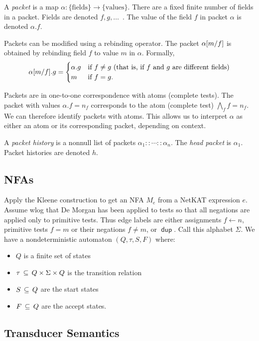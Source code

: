 \documentclass{article}
\newcommand\pdup{\mathop{\mathsf{dup}}}
\begin{document}
A \emph{packet} is a map $\alpha:\{\text{fields}\}\to\{\text{values}\}$. There are a fixed finite number of fields in a packet. Fields are denoted $f,g,\ldots$~. The value of the field $f$ in packet $\alpha$ is denoted $\alpha.f$.

Packets can be modified using a rebinding operator. The packet $\alpha[m/f]$ is obtained by rebinding field $f$ to value $m$ in $\alpha$. Formally,
\begin{align*}
\alpha[m/f].g = \begin{cases}
\alpha.g & \text{if $f\neq g$ (that is, if $f$ and $g$ are different fields)}\\
m & \text{if $f=g$}.
\end{cases}
\end{align*}

Packets are in one-to-one correspondence with atoms (complete tests). The packet with values $\alpha.f=n_f$ corresponds to the atom (complete test) $\bigwedge_f f=n_f$. We can therefore identify packets with atoms. This allows us to interpret $\alpha$ as either an atom or its corresponding packet, depending on context.

A \emph{packet history} is a nonnull list of packets $\alpha_1::\cdots::\alpha_n$. The \emph{head packet} is $\alpha_1$. Packet histories are denoted $h$.

\subsection*{NFAs}

Apply the Kleene construction to get an NFA $M_e$ from a NetKAT expression $e$. Assume wlog that De Morgan has been applied to tests so that all negations are applied only to primitive tests. Thus edge labels are either assignments $f\leftarrow n$, primitive tests $f = m$ or their negations $f\neq m$, or $\pdup$. Call this alphabet $\Sigma$. We have a nondeterministic automaton $(Q,\tau,S,F)$ where:
\begin{itemize}
\item
$Q$ is a finite set of states
\item
$\tau\,\subseteq\, Q\times\Sigma\times Q$ is the transition relation
\item
$S\,\subseteq\, Q$ are the start states
\item
$F\,\subseteq\, Q$ are the accept states.
\end{itemize}

\subsection*{Transducer Semantics}
\end{document}
